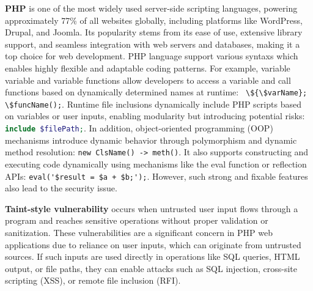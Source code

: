 \textbf{PHP} is one of the most widely used server-side scripting languages, powering approximately 77\% of all websites globally, including platforms like WordPress, Drupal, and Joomla. Its popularity stems from its ease of use, extensive library support, and seamless integration with web servers and databases, making it a top choice for web development. 
PHP language support various syntaxs which enables highly flexible and adaptable coding patterns. For example, variable variable and variable functions allow developers to access a variable and call functions based on dynamically determined names at runtime: \lstinline[language=myPHP]| \${\$varName}; \$funcName();|. 
Runtime file inclusions dynamically include PHP scripts based on variables or user inputs, enabling modularity but introducing potential risks: \lstinline[language=PHP]|include $filePath;|. 
In addition, object-oriented programming (OOP) mechanisms introduce dynamic behavior through polymorphism and dynamic method resolution: \lstinline[language=myPHP]|new ClsName() -> meth()|. 
It also supports constructing and executing code dynamically using mechanisms like the eval function or reflection APIs: \lstinline[language=myPHP]|eval('$result = $a + $b;');|. 
However, such strong and fixable features also lead to the security issue. 

\textbf{Taint-style vulnerability} occurs when untrusted user input flows through a program and reaches sensitive operations without proper validation or sanitization. These vulnerabilities are a significant concern in PHP web applications due to reliance on user inputs, which can originate from untrusted sources. If such inputs are used directly in operations like SQL queries, HTML output, or file paths, they can enable attacks such as SQL injection, cross-site scripting (XSS), or remote file inclusion (RFI). 


